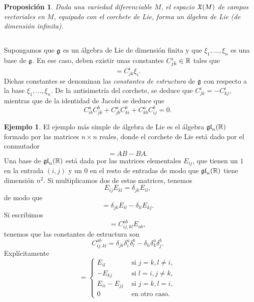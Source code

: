 \documentclass[11pt,a4paper]{amsbook}
\newtheorem{prop}[subsection]{Proposición}
\theoremstyle{remark} \newtheorem{rmk}[subsection]{Observación}
\theoremstyle{definition} \newtheorem{defn}[subsection]{Definición}
\theoremstyle{definition} \newtheorem{ex}[subsection]{Ejemplo}
\theoremstyle{definition} \newtheorem{ej}[subsection]{Ejercicio}
\begin{document}
\begin{prop}
Dada una variedad diferenciable $M$, el espacio $\mathfrak X(M)$ de campos vectoriales en $M$, equipado con el corchete de Lie, forma un álgebra de Lie (de dimensión infinita).
\end{prop}

\subsection{} Supongamos que $\mathfrak{g}$ es un álgebra de Lie de dimensión finita y que $\xi_1,\dots,\xi_n$ es una base de $\mathfrak{g}$. En ese caso, deben existir unas constantes $C^i_{jk}\in \mathbb R$ tales que
\begin{equation*}
[\xi_j,\xi_k] = C^i_{jk} \xi_i.
\end{equation*}
Dichas constantes se denominan las \emph{constantes de estructura} de $\mathfrak{g}$ con respecto a la base $\xi_1,\dots,\xi_n$. De la antisimetría del corchete, se deduce que $C^i_{jk}=-C^i_{kj}$, mientras que de la identidad de Jacobi se deduce que
\begin{equation*}
C_{ib}^a C_{jk}^b + C_{jb}^a C_{ki}^b + C_{kb}^aC_{ij}^b = 0.
\end{equation*}

\begin{ex}
  El ejemplo más simple de álgebra de Lie es el álgebra $\mathfrak{gl}_n(\mathbb R)$ formado por las matrices $n\times n$ reales, donde el corchete de Lie está dado por el conmutador
  \begin{equation*}
[A,B] = AB - BA.
  \end{equation*}
  Una base de $\mathfrak{gl}_n(\mathbb R)$ está dada por las matrices elementales $E_{ij}$, que tienen un $1$ en la entrada $(i,j)$ y un $0$ en el resto de entradas de modo que $\mathfrak{gl}_n(\mathbb R)$ tiene dimensión $n^2$. Si multiplicamos dos de estas matrices, tenemos
  \begin{equation*}
E_{ij}E_{kl} = \delta_{jk} E_{il},
  \end{equation*}
  de modo que
  \begin{equation*}
[E_{ij},E_{kl}] = \delta_{jk} E_{il} - \delta_{li}E_{kj}.
  \end{equation*}
  Si escribimos
  \begin{equation*}
[E_{ij},E_{kl}] =  C^{ab}_{ij,kl} E_{ab},
  \end{equation*}
  tenemos que las constantes de estructura son
  \begin{equation*}
C^{ab}_{ij,kl} = \delta_{jk} \delta^a_{i} \delta^b_{l}- \delta_{li}\delta^a_k \delta^b_j.
  \end{equation*}
  Explícitamente
  \begin{equation*}
    [E_{ij},E_{kl}] =
    \begin{cases}
E_{il} & \text{ si } j=k, l\neq i,\\
      -E_{kj} & \text{ si } l=i, j\neq k, \\
      E_{ii}-E_{jj} & \text{ si } j=k, l=i, \\
      0 & \text{ en otro caso. }
\end{cases}
  \end{equation*}
\end{ex}
\end{document}
